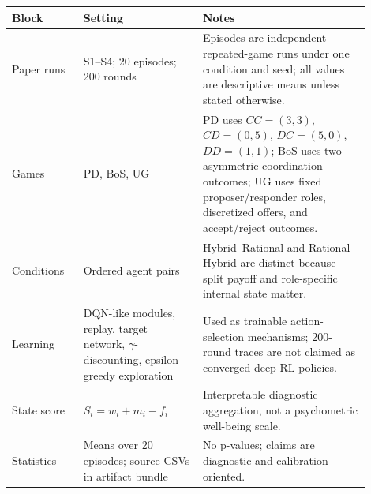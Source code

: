 \begin{tabular}{p{0.18\linewidth}p{0.30\linewidth}p{0.42\linewidth}}
\toprule
Block & Setting & Notes \\
\midrule
Paper runs & S1--S4; 20 episodes; 200 rounds & Episodes are independent repeated-game runs under one condition and seed; all values are descriptive means unless stated otherwise. \\
Games & PD, BoS, UG & PD uses $CC=(3,3)$, $CD=(0,5)$, $DC=(5,0)$, $DD=(1,1)$; BoS uses two asymmetric coordination outcomes; UG uses fixed proposer/responder roles, discretized offers, and accept/reject outcomes. \\
Conditions & Ordered agent pairs & Hybrid--Rational and Rational--Hybrid are distinct because split payoff and role-specific internal state matter. \\
Learning & DQN-like modules, replay, target network, $\gamma$-discounting, epsilon-greedy exploration & Used as trainable action-selection mechanisms; 200-round traces are not claimed as converged deep-RL policies. \\
State score & $S_i=w_i+m_i-f_i$ & Interpretable diagnostic aggregation, not a psychometric well-being scale. \\
Statistics & Means over 20 episodes; source CSVs in artifact bundle & No p-values; claims are diagnostic and calibration-oriented. \\
\bottomrule
\end{tabular}
